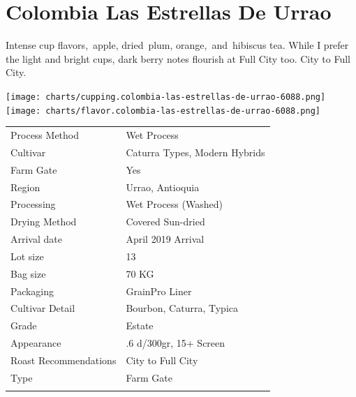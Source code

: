\documentclass[10pt,twoside,footinclude=true,headinclude=true]{scrbook} %
\newlength{\mysize}
\newcommand{\myfontsize}[1]{
  \setlength{\mysize}{#1pt}
  \fontsize{\mysize}{1.2\mysize}
  \selectfont
}
\begin{document}

\chapter*{Colombia Las Estrellas De Urrao}
 
\begin{addmargin}[2.2em]{2.2em}
\small
\justify
Intense cup flavors, apple, dried plum, orange, and hibiscus tea. While I prefer the light and bright cups, dark berry notes flourish at Full City too. City to Full City.
\end{addmargin}

\centering
\vspace{2em}
\texttt{[image: charts/cupping.colombia-las-estrellas-de-urrao-6088.png]}
\texttt{[image: charts/flavor.colombia-las-estrellas-de-urrao-6088.png]}

\vspace{1em}
\begin{table}[htbp]
\myfontsize{7}
\hspace*{2.2em}
\begin{tabular}{ >{\raggedleft\arraybackslash}p{3.6cm}!{\color{lightgray}\vrule}p{7cm} }
\hline
  Process Method & Wet Process \\
  \hline
  Cultivar & Caturra Types, Modern Hybrids \\
  \hline
  Farm Gate & Yes \\
  \hline
  Region & Urrao, Antioquia \\
  \hline
  Processing & Wet Process (Washed) \\
  \hline
  Drying Method & Covered Sun-dried \\
  \hline
  Arrival date & April 2019 Arrival \\
  \hline
  Lot size & 13 \\
  \hline
  Bag size & 70 KG \\
  \hline
  Packaging & GrainPro Liner \\
  \hline
  Cultivar Detail & Bourbon, Caturra, Typica \\
  \hline
  Grade & Estate \\
  \hline
  Appearance & .6 d/300gr, 15+ Screen \\
  \hline
  Roast Recommendations & City to Full City \\
  \hline
  Type & Farm Gate \\
  \hline

\end{tabular}
\end{table}
\end{document}
